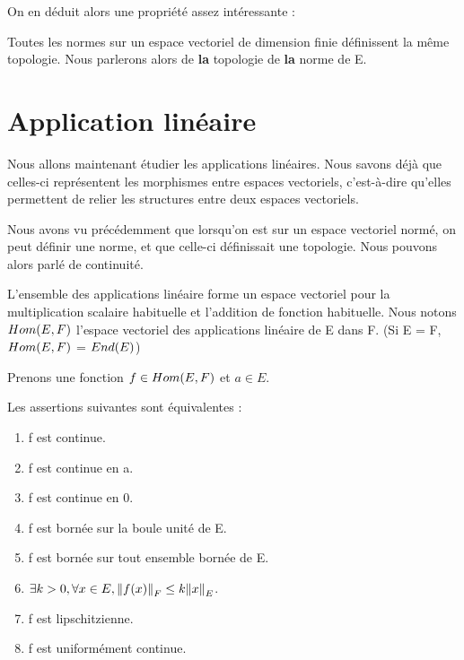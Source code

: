 On en déduit alors une propriété assez intéressante :

\begin{proposition}
	Toutes les normes sur un espace vectoriel de dimension finie définissent la
	même topologie. Nous parlerons alors de \textbf{la} topologie de \textbf{la} norme de E.
\end{proposition}

\section{Application linéaire}
Nous allons maintenant étudier les applications linéaires. Nous savons déjà que
celles-ci représentent les morphismes entre espaces vectoriels, c'est-à-dire
qu'elles permettent de relier les structures entre deux espaces vectoriels.

Nous avons vu précédemment que lorsqu'on est sur un espace vectoriel normé, on
peut définir une norme, et que celle-ci définissait une topologie. Nous pouvons
alors parlé de continuité.

\begin{definition}
	L'ensemble des applications linéaire forme un espace vectoriel pour la
	multiplication scalaire habituelle et l'addition de fonction habituelle.
	Nous notons $Hom(E, F)$ l'espace vectoriel des applications
	linéaire de E dans F. (Si E = F, $Hom(E, F)$ =
	$End(E)$)
\end{definition}

Prenons une fonction $f \in Hom(E, F)$ et $a \in E$.

\begin{proposition}
	Les assertions suivantes sont équivalentes :

	\begin{enumerate}
		\item f est continue.
		\item f est continue en a.
		\item f est continue en 0.
		\item f est bornée sur la boule unité de E.
		\item f est bornée sur tout ensemble bornée de E.
		\item $\exists k > 0, \forall x \in E, \norm{f(x)}_{F} \leq k
			\norm{x}_{E}$.
		\item f est lipschitzienne.
		\item f est uniformément continue.
	\end{enumerate}
\end{proposition}

